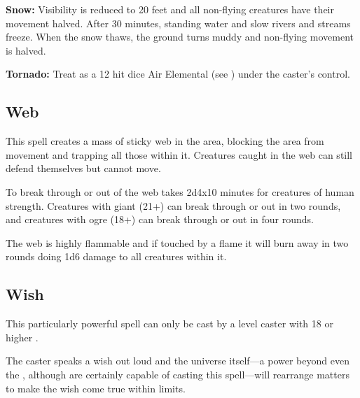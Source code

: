 \begin{multicols*}{2}
\textbf{Snow:} Visibility is reduced to 20 feet and all non-flying creatures have their movement halved. After 30 minutes, standing water and slow rivers and streams freeze. When the snow thaws, the ground turns muddy and non-flying movement is halved.

\textbf{Tornado:} Treat as a 12 hit dice Air Elemental (see ) under the caster’s control.

\subsection{Web}\label{spell:Web}

This spell creates a mass of sticky web in the area, blocking the area from movement and trapping all those within it. Creatures caught in the web can still defend themselves but cannot move.

To break through or out of the web takes 2d4x10 minutes for creatures of human strength. Creatures with giant  (21+) can break through or out in two rounds, and creatures with ogre  (18+) can break through or out in four rounds.

The web is highly flammable and if touched by a flame it will burn away in two rounds doing 1d6 damage to all creatures within it.

\subsection{Wish}\label{spell:Wish}

This particularly powerful spell can only be cast by a  level caster with 18 or higher .

The caster speaks a wish out loud and the universe itself—a power beyond even the , although  are certainly capable of casting this spell—will rearrange matters to make the wish come true within limits.


\end{multicols*}

